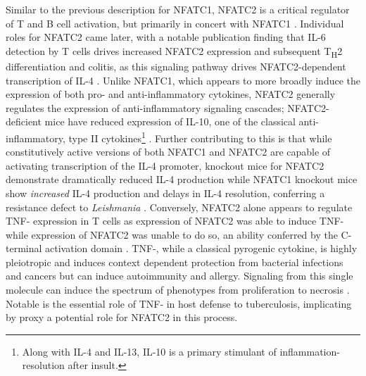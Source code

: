 Similar to the previous description for NFATC1, NFATC2 is a critical regulator of T and B cell activation, but primarily in concert with NFATC1 \citep{Peng2001}. Individual roles for NFATC2 came later, with a notable publication finding that IL-6 detection by T cells drives increased NFATC2 expression and subsequent T\textsubscript{H}2 differentiation and colitis, as this signaling pathway drives NFATC2-dependent transcription of IL-4 \citep{Diehl2002, Weigmann2008}. Unlike NFATC1, which appears to more broadly induce the expression of both pro- and anti-inflammatory cytokines, NFATC2 generally regulates the expression of anti-inflammatory signaling cascades; NFATC2-deficient mice have reduced expression of IL-10, one of the classical anti-inflammatory, type II cytokines\footnote{Along with IL-4 and IL-13, IL-10 is a primary stimulant of inflammation-resolution after insult.} \citep{Lee2009}. Further contributing to this is that while constitutively active versions of both NFATC1 and NFATC2 are capable of activating transcription of the IL-4 promoter, knockout mice for NFATC2 demonstrate dramatically reduced IL-4 production while NFATC1 knockout mice show \textit{increased} IL-4 production \citep{Monticelli2002} and delays in IL-4 resolution, conferring a resistance defect to \textit{Leishmania} \citep{Kiani1997}. Conversely, NFATC2 alone appears to regulate TNF-\textalpha{} expression in T cells as expression of NFATC2 was able to induce TNF-\textalpha{} while expression of NFATC2 was unable to do so, an ability conferred by the C-terminal activation domain \citep{Kaminuma2008}. TNF-\textalpha, while a classical pyrogenic cytokine, is highly pleiotropic and induces context dependent protection from bacterial infections and cancers but can induce autoimmunity and allergy. Signaling from this single molecule can induce the spectrum of phenotypes from proliferation to necrosis \citep{Gough2020}. Notable is the essential role of TNF-\textalpha{} in host defense to tuberculosis, implicating by proxy a potential role for NFATC2 in this process. 

